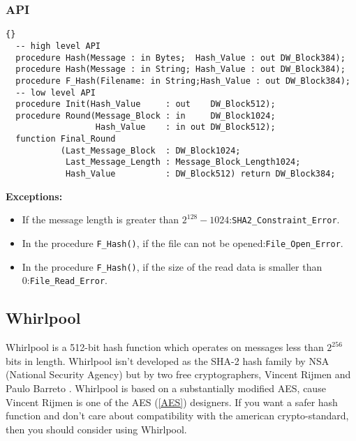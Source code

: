 \subsubsection*{API}
\begin{lstlisting}{}
  -- high level API
  procedure Hash(Message : in Bytes;  Hash_Value : out DW_Block384);
  procedure Hash(Message : in String; Hash_Value : out DW_Block384);
  procedure F_Hash(Filename: in String;Hash_Value : out DW_Block384);
  -- low level API
  procedure Init(Hash_Value     : out    DW_Block512);
  procedure Round(Message_Block : in     DW_Block1024;
                  Hash_Value    : in out DW_Block512);
  function Final_Round
           (Last_Message_Block  : DW_Block1024;
            Last_Message_Length : Message_Block_Length1024;
            Hash_Value          : DW_Block512) return DW_Block384;
\end{lstlisting}
\textbf{Exceptions:}
\begin{itemize}
\item If the message length is greater than
  $2^{128}-1024$:\quad\texttt{SHA2\_Constraint\_Error}.
\item In the procedure \texttt{F\_Hash()}, if the file can not be
  opened:\quad\texttt{File\_Open\_Error}.
\item In the procedure \texttt{F\_Hash()}, if the size of the read
  data is smaller than 0:\quad\texttt{File\_Read\_Error}.
\end{itemize}


\subsection{Whirlpool}
Whirlpool is a 512-bit hash function which operates on messages less
than $2^{256}$ bits in length. Whirlpool isn't developed as the SHA-2
hash family by NSA (National Security Agency) but by two free
cryptographers, Vincent Rijmen and Paulo Barreto
\cite{Whirlpool}. Whirlpool is based on a substantially modified AES,
cause Vincent Rijmen is one of the AES (\ref{AES}) designers. If you
want a safer hash function and don't care about compatibility with the
american crypto-standard, then you should consider using Whirlpool.
